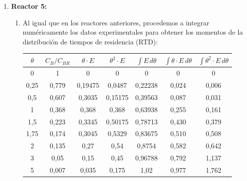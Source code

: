 \begin{enumerate}
	\item \textbf{Reactor 5:}
	      \begin{enumerate}[label={\alph*)}]
		      \item Al igual que en los reactores anteriores, procedemos a integrar numéricamente los datos experimentales para obtener los momentos de la distribución de tiempos de residencia (RTD):
		            \begin{center}
			            \begin{tabular}{|c|c|c|c|c|c|c|}
				            \hline
				            $\theta$ & $C_B/C_{BR}$ & $\theta \cdot E$ & $\theta^2 \cdot E$ & $\int E \, d\theta$ & $\int \theta \cdot E \, d\theta$ & $\int \theta^2 \cdot E \, d\theta$ \\ \hline
				            0        & 1            & 0                & 0                  & 0                   & 0                                & 0                                  \\ \hline
				            0,25     & 0,779        & 0,19475          & 0,0487             & 0,22238             & 0,024                            & 0,006                              \\ \hline
				            0,5      & 0,607        & 0,3035           & 0,15175            & 0,39563             & 0,087                            & 0,031                              \\ \hline
				            1        & 0,368        & 0,368            & 0,368              & 0,63938             & 0,255                            & 0,161                              \\ \hline
				            1,5      & 0,223        & 0,3345           & 0,50175            & 0,78713             & 0,430                            & 0,379                              \\ \hline
				            1,75     & 0,174        & 0,3045           & 0,5329             & 0,83675             & 0,510                            & 0,508                              \\ \hline
				            2        & 0,135        & 0,27             & 0,54               & 0,8754              & 0,582                            & 0,642                              \\ \hline
				            3        & 0,05         & 0,15             & 0,45               & 0,96788             & 0,792                            & 1,137                              \\ \hline
				            5        & 0,007        & 0,035            & 0,175              & 1,02                & 0,977                            & 1,762                              \\ \hline

\end{tabular}
\end{center}
\end{enumerate}
\end{enumerate}
